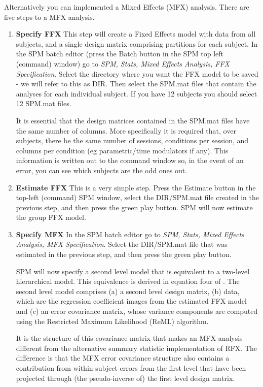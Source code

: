 Alternatively you can implemented a Mixed Effects (MFX) analysis.
There are five steps to a MFX analysis.
\begin{enumerate}
\item \textbf{Specify FFX}
This step will create a Fixed Effects model with data from all subjects, and a single design matrix comprising partitions for each subject.
In the SPM batch editor (press the Batch button in the SPM top left (command) window) go to {\em SPM, Stats, Mixed Effects Analysis, FFX Specification}. Select the directory where you want the FFX model to be saved - we will refer to this as DIR.
Then select the SPM.mat files that contain the analyses for each individual subject. If you have 12 subjects you should select 12 SPM.mat files.

It is essential that the design matrices contained in the SPM.mat files have the same number of columns. More specifically it is required that, over subjects, there be the same number of sessions, conditions per session, and columns per condition (eg parametric/time modulators if any). This information is written out to the command window so, in the event of an error, you can see which subjects are the odd ones out.

\item \textbf{Estimate FFX}
This is a very simple step. Press the Estimate button in the top-left (command) SPM window, select the DIR/SPM.mat file created in the previous step, and then press the green play button. SPM will now estimate the group FFX model.

\item \textbf{Specify MFX} In the SPM batch editor go to {\em SPM, Stats, Mixed Effects Analysis, MFX Specification}. Select the DIR/SPM.mat file that was estimated in the previous step, and then press the green play button.

    SPM will now specify a second level model that is equivalent to a two-level hierarchical model. This equivalence is derived in equation four of \cite{karl_mixed}. The second level model comprises (a) a second level design matrix, (b) data, which are the regression coefficient images from the estimated FFX model and (c) an error covariance matrix, whose variance components are computed using the Restricted Maximum Likelihood (ReML) algorithm.

    It is the structure of this covariance matrix that makes an MFX analysis different from the alternative summary statistic implementation of RFX. The difference is that the MFX error covariance structure also contains a contribution from within-subject errors from the first level that have been projected through (the pseudo-inverse of) the first level design matrix.


\end{enumerate}
